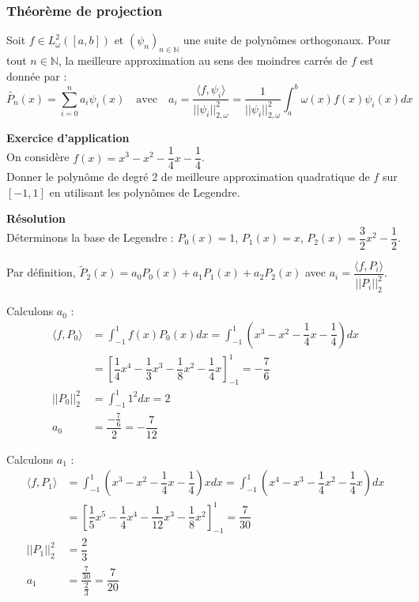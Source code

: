 \subsubsection*{Théorème de projection}
Soit $f \in L^2_\omega([a,b])$ et $(\psi_n)_{n\in \mathbb{N}}$ une suite de polynômes orthogonaux. Pour tout $n \in \mathbb{N}$, la meilleure approximation au sens des moindres carrés de $f$ est donnée par :
$$\tilde{P_n}(x)=\displaystyle\sum_{i=0}^{n}a_i\psi_i(x) \quad \text{avec} \quad a_i=\dfrac{\langle f,\psi_i\rangle}{||\psi_i||_{2,\omega}^2}=\dfrac{1}{||\psi_i||_{2,\omega}^2}\displaystyle\int_a^b\omega(x)f(x)\psi_i(x)dx$$

\textbf{Exercice d'application} \\
On considère $f(x)=x^3-x^2-\dfrac{1}{4}x-\dfrac{1}{4}$. \\
Donner le polynôme de degré 2 de meilleure approximation quadratique de $f$ sur $[-1,1]$ en utilisant les polynômes de Legendre.

\textbf{Résolution} \\
Déterminons la base de Legendre :
$P_0(x)=1$, $P_1(x)=x$, $P_2(x)=\dfrac{3}{2}x^2-\dfrac{1}{2}$.

Par définition, $\tilde{P}_2(x)=a_0P_0(x)+a_1P_1(x)+a_2P_2(x)$ avec $a_i=\dfrac{\langle f,P_i\rangle}{||P_i||_{2}^2}$.

Calculons $a_0$ :
\begin{align*}
\langle f,P_0\rangle &= \displaystyle\int_{-1}^1 f(x)P_0(x)dx = \displaystyle\int_{-1}^1 \left(x^3-x^2-\dfrac{1}{4}x-\dfrac{1}{4}\right)dx \\
&= \left[\dfrac{1}{4}x^4-\dfrac{1}{3}x^3-\dfrac{1}{8}x^2-\dfrac{1}{4}x\right]_{-1}^1 = -\dfrac{7}{6} \\
||P_0||_2^2 &= \displaystyle\int_{-1}^1 1^2 dx = 2 \\
a_0 &= \dfrac{-\frac{7}{6}}{2} = -\dfrac{7}{12}
\end{align*}

Calculons $a_1$ :
\begin{align*}
\langle f,P_1\rangle &= \displaystyle\int_{-1}^1 \left(x^3-x^2-\dfrac{1}{4}x-\dfrac{1}{4}\right)xdx = \displaystyle\int_{-1}^1 \left(x^4-x^3-\dfrac{1}{4}x^2-\dfrac{1}{4}x\right)dx \\
&= \left[\dfrac{1}{5}x^5-\dfrac{1}{4}x^4-\dfrac{1}{12}x^3-\dfrac{1}{8}x^2\right]_{-1}^1 = \dfrac{7}{30} \\
||P_1||_2^2 &= \dfrac{2}{3} \\
a_1 &= \dfrac{\frac{7}{30}}{\frac{2}{3}} = \dfrac{7}{20}
\end{align*}

